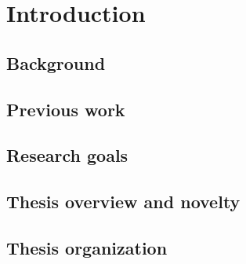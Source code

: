 \chapter{Introduction}

\section{Background}

\section{Previous work}

\section{Research goals}

\section{Thesis overview and novelty}

\section{Thesis organization}
